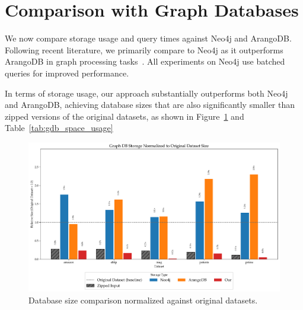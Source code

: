 \section{Comparison with Graph Databases}

We now compare storage usage and query times against Neo4j and ArangoDB. Following recent literature, we primarily compare to Neo4j as it outperforms ArangoDB in graph processing tasks~\cite{sandell2024}. All experiments on Neo4j use batched queries for improved performance.

In terms of storage usage, our approach substantially outperforms both Neo4j and ArangoDB, achieving database sizes that are also significantly smaller than zipped versions of the original datasets, as shown in Figure~\ref{fig:storage_vs_files} and Table~\ref{tab:gdb_space_usage}

\begin{figure}[htbp]
  \centering
  \includegraphics[width=\linewidth]{plots/graphdb_storage.pdf}
  \caption{Database size comparison normalized against original datasets.}
  \label{fig:storage_vs_files}
\end{figure}
\FloatBarrier

\begin{table}[htbp]
  \centering
  \caption{Database sizes (MB) for different storage options and systems.}
  \label{tab:gdb_space_usage}
\end{table}
\FloatBarrier

